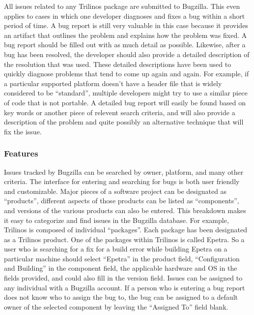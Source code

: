 \documentclass[12pt,relax]{article}
\begin{document}
All issues related to any Trilinos package are submitted to Bugzilla.  This 
even applies to cases in which 
one developer diagnoses and fixes a bug within a short period of time.  A bug 
report is still very valuable in this case because it provides an artifact 
that outlines the problem and explains how the problem was fixed.  A bug 
report should be filled out with as much detail as possible.  Likewise, after 
a bug has been resolved, the developer should also provide a detailed 
description of the resolution that was used.  These detailed descriptions have 
been used to quickly diagnose problems that tend to come up again and again.
For example, if a particular supported platform doesn't have a header file 
that is widely considered to be ``standard'', multiple developers might try 
to use a similar piece of code that is not portable.  A detailed bug report 
will easily be found based on key words or another piece of relevent search 
criteria, and will also provide a description of the problem and quite 
possibly an alternative technique that will fix the issue. 

\subsubsection{Features}

Issues tracked by Bugzilla can be searched by owner, platform, and many other 
criteria.  The 
interface for entering and searching for bugs is both user friendly and 
customizable.  Major pieces of a software project can be 
designated as ``products'', different aspects of those products can be 
listed as ``components'', and versions of the various products can also be 
entered.  This breakdown makes it easy to categorize and find issues in the 
Bugzilla database.  For example, Trilinos is composed of individual 
``packages''.  Each package has been designated as a Trilinos product.  One of 
the packages within Trilinos is called Epetra.  So a user who is searching for 
a fix for a build error while building Epetra on a particular 
machine should select ``Epetra'' in the product field, ``Configuration and 
Building'' in the component field, the applicable hardware and OS in the 
fields provided, and
could also fill in the version field.  Issues can be assigned to any 
individual with a Bugzilla account.  If a 
person who is entering a bug report does not know who to assign the bug to,
the bug can be assigned to a default owner of the selected component 
by leaving the ``Assigned To'' field blank.  
\end{document}
